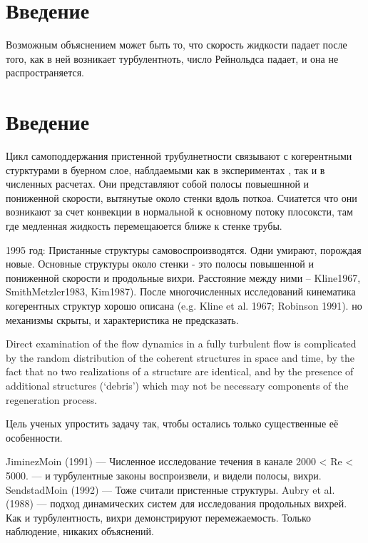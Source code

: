 \chapter{Введение}






Возможным объяснением может быть то, что скорость жидкости падает после того, как в ней возникает турбулентноть, число Рейнольдса падает, и она не распространяется. 

\chapter{Введение}


Цикл самоподдержания пристенной трубулнетности связывают с когерентными стурктурами в буерном слое, наблдаемыми как в экспериментах \cite{kline1967structure}, так и в численных расчетах. Они представляют собой полосы повыешнной и пониженной скорости, вытянутые около стенки вдоль поткоа. Счиатется что они возникают за счет конвекции в нормальной к основному потоку плосоксти, там где медленная жидкость перемещаюется ближе к стенке трубы. 


1995 год: Пристанные структуры самовоспроизводятся. Одни умирают, порождая новые. Основные структуры около стенки - это полосы повышенной и пониженной скорости и продольные вихри. Расстояние между ними -- Kline1967, SmithMetzler1983, Kim1987). После многочисленных исследований кинематика когерентных структур хорошо описана (e.g. Kline et al. 1967; Robinson 1991). но механизмы скрыты, и характеристика не предсказать. 

Direct examination of the flow dynamics in a fully turbulent flow is complicated by the random distribution of the coherent structures in space and time, by the fact that no two realizations of a structure are identical, and by the presence of additional structures (‘debris’) which may not be necessary components of the regeneration process.

Цель ученых упростить задачу так, чтобы остались только существенные её особенности. 

JiminezMoin (1991) --- Численное исследование течения в канале 2000 < Re < 5000. --- и турбулентные законы воспроизвели, и видели полосы, вихри. 
SendstadMoin (1992) --- Тоже считали пристенные структуры. 
Aubry et al. (1988) --- подход динамических систем для исследования продольных вихрей. Как и турбулентность, вихри демонстрируют перемежаемость. Только наблюдение, никаких объяснений. 

